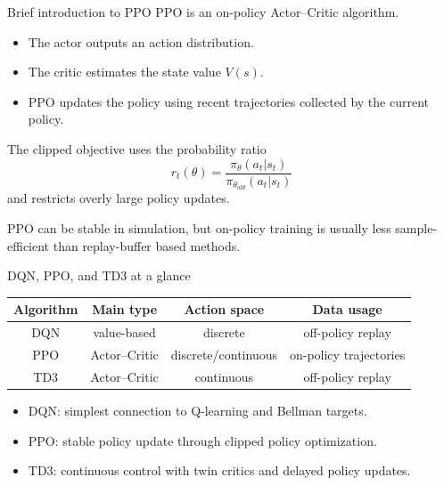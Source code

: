 \documentclass[aspectratio=169]{beamer}
\begin{document}
\begin{frame}{Brief introduction to PPO}
PPO is an on-policy Actor--Critic algorithm.


\begin{itemize}
    \item The actor outputs an action distribution.

    \item The critic estimates the state value $V(s)$.

    \item PPO updates the policy using recent trajectories collected by the current policy.
\end{itemize}


The clipped objective uses the probability ratio
\[
r_t(\theta)=\frac{\pi_\theta(a_t|s_t)}{\pi_{\theta_{old}}(a_t|s_t)}
\]
and restricts overly large policy updates.


PPO can be stable in simulation, but on-policy training is usually less sample-efficient than replay-buffer based methods.

\end{frame}

\begin{frame}{DQN, PPO, and TD3 at a glance}
\begin{center}
\begin{tabular}{c|c|c|c}
\hline
Algorithm & Main type & Action space & Data usage \\
\hline
DQN & value-based & discrete & off-policy replay \\
PPO & Actor--Critic & discrete/continuous & on-policy trajectories \\
TD3 & Actor--Critic & continuous & off-policy replay \\
\hline
\end{tabular}
\end{center}

\vspace{0.35cm}
\begin{itemize}
    \item DQN: simplest connection to Q-learning and Bellman targets.
    \vspace{0.18cm}
    \item PPO: stable policy update through clipped policy optimization.
    \vspace{0.18cm}
    \item TD3: continuous control with twin critics and delayed policy updates.
\end{itemize}
\end{frame}
\end{document}
